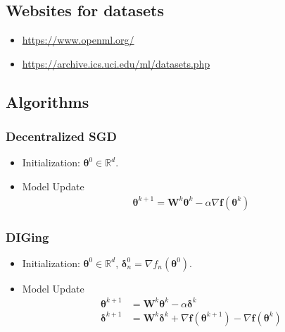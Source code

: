 \documentclass[12pt,draftclsnofoot,onecolumn]{IEEEtran}
\begin{document}
\subsection{Websites for datasets}
\begin{itemize}
\item \url{https://www.openml.org/}
\item \url{https://archive.ics.uci.edu/ml/datasets.php}
\end{itemize}
\subsection{Algorithms}
\subsubsection{Decentralized SGD}
\begin{itemize}
    \item Initialization: $\bm{\theta}^0 \in \mathbb{R}^d$.
    \item Model Update
    \begin{align}
    \bm{\theta}^{k+1} = \bm{W}^{k} \bm{\theta}^k - \alpha \nabla \bm{f}(\bm{\theta}^k)
    \end{align}
\end{itemize}

\subsubsection{DIGing}
\begin{itemize}
    \item Initialization: $\bm{\theta}^0 \in \mathbb{R}^d$, $\bm{\delta}_n^0 = \nabla f_n(\bm{\theta}^0)$.
    \item Model Update
    \begin{align}
    \bm{\theta}^{k+1} &= \bm{W}^{k} \bm{\theta}^k - \alpha \bm{\delta}^k \\
    \bm{\delta}^{k+1} &= \bm{W}^{k} \bm{\delta}^{k} +  \nabla \bm{f}(\bm{\theta}^{k+1}) - \nabla \bm{f}(\bm{\theta}^{k})
    \end{align}
\end{itemize}
\end{document}

